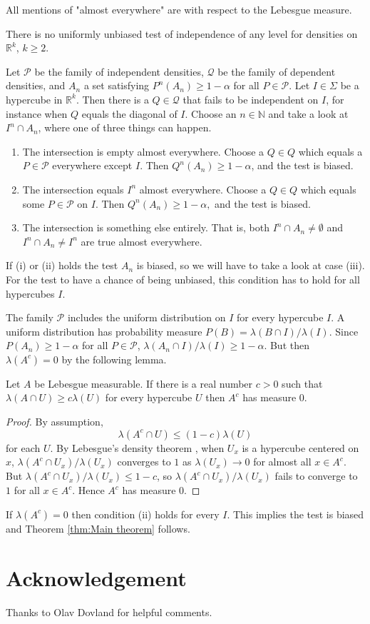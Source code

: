 \documentclass[twoside]{article}
\newcommand{\1}{\mathbf{1}}
\begin{document}
All mentions of "almost everywhere" are with respect to the Lebesgue
measure.
\begin{thm}
\label{thm:Main theorem}There is no uniformly unbiased test of independence
of any level for densities on $\mathbb{R}^{k}$, $k\geq2$.
\end{thm}
Let $\mathcal{P}$ be the family of independent densities, $\mathcal{Q}$ be the family of dependent densities, and $A_n$ a set satisfying $P^{n}\left(A_{n}\right)\geq1-\alpha$ for all $P\in \mathcal{P}$. Let $I\in\Sigma$ be a hypercube in $\mathbb{R}^{k}$. Then there
is a $Q\in\mathcal{Q}$ that fails to be independent on $I$, for
instance when $Q$ equals the diagonal of $I$. Choose an $n\in\mathbb{N}$
and take a look at $I^{n}\cap A_{n}$, where one of three things can happen.
\begin{enumerate}[label=(\roman*)]
\item The intersection is empty almost everywhere. Choose a $Q\in Q$
which equals a $P\in\mathcal{P}$ everywhere except $I$. Then $Q^{n}\left(A_{n}\right)\geq1-\alpha$,
and the test is biased.
\item The intersection equals $I^{n}$ almost everywhere. Choose a $Q\in Q$ which equals some $P\in\mathcal{P}$ on $I$. Then $Q^{n}\left(A_{n}\right)\geq1-\alpha,$ and the test is biased.
\item The intersection is something else entirely. That is, both $I^{n}\cap A_{n}\neq\emptyset$ and $I^{n}\cap A_{n}\neq I^{n}$ are true almost everywhere.
\end{enumerate}
If (i) or (ii) holds the test $A_{n}$ is biased, so we will have to take a look at case (iii). For the test to have a chance of being unbiased, this condition has to hold for all hypercubes $I$. 

The family $\mathcal{P}$ includes the uniform distribution on $I$ for every hypercube $I$. A uniform distribution has probability measure $P\left(B\right)=\lambda\left(B\cap I\right)/\lambda\left(I\right)$. Since $P\left(A_{n}\right)\geq1-\alpha$ for all $P\in\mathcal{P}$, $\lambda\left(A_{n}\cap I\right)/\lambda\left(I\right)\geq1-\alpha$. But then $\lambda\left(A^{c}\right)=0$ by the following lemma.
\begin{lem}
\label{lem:Main lemma}Let $A$ be Lebesgue measurable. If there is a real number $c>0$ such that $\lambda\left(A\cap U\right)\geq c\lambda\left(U\right)$ for every hypercube $U$ then $A^{c}$ has measure $0$.
\end{lem}
\begin{proof}
By assumption, $$\lambda\left(A^{c}\cap U\right)\leq\left(1-c\right)\lambda\left(U\right)$$ for each $U$. By Lebesgue's density theorem \citep[Theorem 7.10]{rudin2006real}, when $U_{x}$ is a hypercube centered on $x$, $\lambda\left(A^{c}\cap U_{x}\right)/\lambda\left(U_{x}\right)$ converges to $1$ as $\lambda\left(U_x\right) \to 0$ for almost all $x\in A^{c}.$ But $\lambda\left(A^{c}\cap U_{x}\right)/\lambda\left(U_{x}\right)\leq1-c$, so $\lambda\left(A^{c}\cap U_{x}\right)/\lambda\left(U_{x}\right)$ fails to converge to $1$ for all $x\in A^{c}$. Hence $A^{c}$ has measure $0$.
\end{proof}
If $\lambda\left(A^{c}\right)=0$ then condition (ii) holds for every $I$. This implies the test is biased and Theorem \ref{thm:Main theorem} follows.
\section*{Acknowledgement}
Thanks to Olav Dovland for helpful comments.

\end{document}
